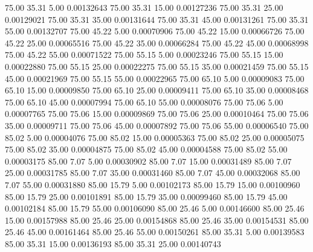      75.00     35.31      5.00     0.00132643
     75.00     35.31     15.00     0.00127236
     75.00     35.31     25.00     0.00129021
     75.00     35.31     35.00     0.00131644
     75.00     35.31     45.00     0.00131261
     75.00     35.31     55.00     0.00132707
     75.00     45.22      5.00     0.00070906
     75.00     45.22     15.00     0.00066726
     75.00     45.22     25.00     0.00065516
     75.00     45.22     35.00     0.00066284
     75.00     45.22     45.00     0.00068998
     75.00     45.22     55.00     0.00071522
     75.00     55.15      5.00     0.00023246
     75.00     55.15     15.00     0.00022880
     75.00     55.15     25.00     0.00022275
     75.00     55.15     35.00     0.00021459
     75.00     55.15     45.00     0.00021969
     75.00     55.15     55.00     0.00022965
     75.00     65.10      5.00     0.00009083
     75.00     65.10     15.00     0.00009850
     75.00     65.10     25.00     0.00009411
     75.00     65.10     35.00     0.00008468
     75.00     65.10     45.00     0.00007994
     75.00     65.10     55.00     0.00008076
     75.00     75.06      5.00     0.00007765
     75.00     75.06     15.00     0.00009869
     75.00     75.06     25.00     0.00010464
     75.00     75.06     35.00     0.00009711
     75.00     75.06     45.00     0.00007892
     75.00     75.06     55.00     0.00006540
     75.00     85.02      5.00     0.00004076
     75.00     85.02     15.00     0.00005363
     75.00     85.02     25.00     0.00005075
     75.00     85.02     35.00     0.00004875
     75.00     85.02     45.00     0.00004588
     75.00     85.02     55.00     0.00003175
     85.00      7.07      5.00     0.00030902
     85.00      7.07     15.00     0.00031489
     85.00      7.07     25.00     0.00031785
     85.00      7.07     35.00     0.00031460
     85.00      7.07     45.00     0.00032068
     85.00      7.07     55.00     0.00031880
     85.00     15.79      5.00     0.00102173
     85.00     15.79     15.00     0.00100960
     85.00     15.79     25.00     0.00101891
     85.00     15.79     35.00     0.00099460
     85.00     15.79     45.00     0.00102184
     85.00     15.79     55.00     0.00106090
     85.00     25.46      5.00     0.00146600
     85.00     25.46     15.00     0.00157988
     85.00     25.46     25.00     0.00154868
     85.00     25.46     35.00     0.00154531
     85.00     25.46     45.00     0.00161464
     85.00     25.46     55.00     0.00150261
     85.00     35.31      5.00     0.00139583
     85.00     35.31     15.00     0.00136193
     85.00     35.31     25.00     0.00140743
